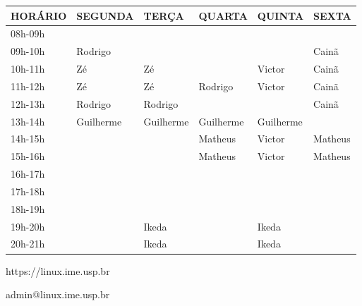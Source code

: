 \documentclass[12pt]{article}
\newcommand{\cai}{Cainã}
\newcommand{\gui}{Guilherme}
\newcommand{\ike}{Ikeda}
\newcommand{\mat}{Matheus}
\newcommand{\rod}{Rodrigo}
\newcommand{\vic}{Victor}
\newcommand{\zee}{Zé}
\newcommand{\tnhl}{\tabularnewline\hline}
\begin{document}
\begin{center}
  \Large
  \begin{tabular}{ |x{3.5cm}|x{3.5cm}|x{3.5cm}|x{3.5cm}|x{3.5cm}|x{3.5cm}| }
    \hline
    \textbf{HORÁRIO} & \textbf{SEGUNDA} & \textbf{TERÇA} & \textbf{QUARTA} & \textbf{QUINTA} & \textbf{SEXTA} \tnhl
    08h-09h          & {}               & {}             & {}              & {}              & {}             \tnhl
    09h-10h          & \rod             & {}             & {}              & {}              & \cai           \tnhl
    10h-11h          & \zee             & \zee           & {}              & \vic            & \cai           \tnhl
    11h-12h          & \zee             & \zee           & \rod            & \vic            & \cai           \tnhl
    12h-13h          & \rod             & \rod           & {}              & {}              & \cai           \tnhl
    13h-14h          & \gui             & \gui           & \gui            & \gui            & {}             \tnhl
    14h-15h          & {}               & {}             & \mat            & \vic            & \mat           \tnhl
    15h-16h          & {}               & {}             & \mat            & \vic            & \mat           \tnhl
    16h-17h          & {}               & {}             & {}              & {}              & {}             \tnhl
    17h-18h          & {}               & {}             & {}              & {}              & {}             \tnhl
    18h-19h          & {}               & {}             & {}              & {}              & {}             \tnhl
    19h-20h          & {}               & \ike           & {}              & \ike            & {}             \tnhl
    20h-21h          & {}               & \ike           & {}              & \ike            & {}             \tnhl
  \end{tabular}

  \vspace{1.5cm}
  {\selectfont
    \normalsize
    https://linux.ime.usp.br
    
    admin@linux.ime.usp.br
  }
\end{center}
\end{document}
